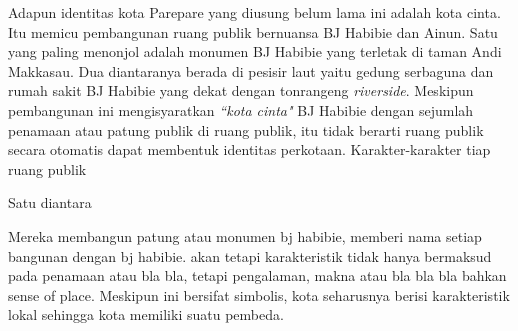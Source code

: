 \documentclass[12pt]{simart} %
\begin{document}
Adapun identitas kota Parepare yang diusung belum lama ini adalah kota cinta. Itu memicu pembangunan ruang publik bernuansa BJ Habibie dan Ainun. Satu yang paling menonjol adalah monumen BJ Habibie yang terletak di taman Andi Makkasau. Dua diantaranya berada di pesisir laut yaitu gedung serbaguna dan rumah sakit BJ Habibie yang dekat dengan tonrangeng \textit{riverside}.
Meskipun pembangunan ini mengisyaratkan \textit{``kota cinta"} BJ Habibie dengan sejumlah penamaan atau patung publik di ruang publik, itu tidak berarti ruang publik secara otomatis dapat membentuk identitas perkotaan. Karakter-karakter tiap ruang publik

Satu diantara


Mereka membangun patung atau monumen bj habibie, memberi nama setiap bangunan dengan bj habibie. akan tetapi karakteristik tidak hanya bermaksud pada penamaan atau bla bla, tetapi pengalaman, makna atau bla bla bla bahkan sense of place.
Meskipun ini bersifat simbolis,
kota seharusnya berisi karakteristik lokal sehingga kota memiliki suatu pembeda.
\end{document}
